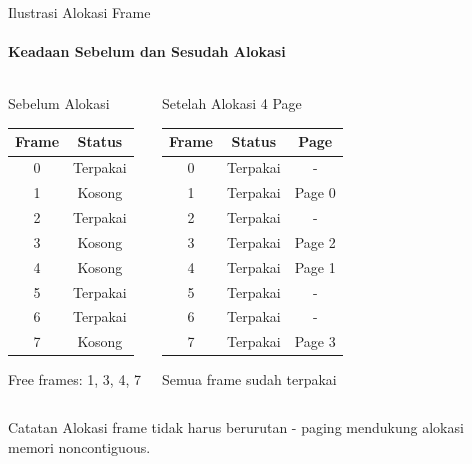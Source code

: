 \documentclass[10pt,aspectratio=169]{beamer}
\begin{document}
\begin{frame}{Ilustrasi Alokasi Frame}
    \framesubtitle{Keadaan Sebelum dan Sesudah Alokasi}
    
    \begin{columns}[T]
            \begin{block}{Sebelum Alokasi}
                \begin{tabular}{|c|c|}
                    \hline
                    \textbf{Frame} & \textbf{Status} \\ \hline
                    0 & Terpakai \\ \hline
                    1 & Kosong \\ \hline
                    2 & Terpakai \\ \hline
                    3 & Kosong \\ \hline
                    4 & Kosong \\ \hline
                    5 & Terpakai \\ \hline
                    6 & Terpakai \\ \hline
                    7 & Kosong \\ \hline
                \end{tabular}
                
                \scriptsize Free frames: 1, 3, 4, 7
            \end{block}
            
            \begin{alertblock}{Setelah Alokasi 4 Page}
                \begin{tabular}{|c|c|c|}
                    \hline
                    \textbf{Frame} & \textbf{Status} & \textbf{Page} \\ \hline
                    0 & Terpakai & - \\ \hline
                    1 & Terpakai & Page 0 \\ \hline
                    2 & Terpakai & - \\ \hline
                    3 & Terpakai & Page 2 \\ \hline
                    4 & Terpakai & Page 1 \\ \hline
                    5 & Terpakai & - \\ \hline
                    6 & Terpakai & - \\ \hline
                    7 & Terpakai & Page 3 \\ \hline
                \end{tabular}
                
                \scriptsize Semua frame sudah terpakai
            \end{alertblock}
    \end{columns}
    
    \begin{block}{Catatan}
        Alokasi frame tidak harus berurutan - paging mendukung alokasi memori noncontiguous.
    \end{block}
\end{frame}
\end{document}

